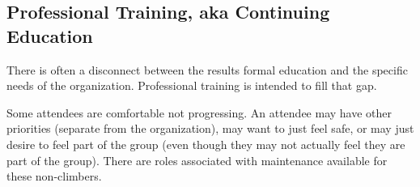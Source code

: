 \subsection{Professional Training, aka Continuing Education\label{sec:professional-training}}

There is often a disconnect between the results formal education and the specific needs of the organization. Professional training is intended to fill that gap.  

Some attendees are comfortable not progressing. An attendee may have other priorities (separate from the organization), may want to just feel safe, or may just desire to feel part of the group (even though they may not actually feel they are part of the group).
There are roles associated with maintenance available for these non-climbers.